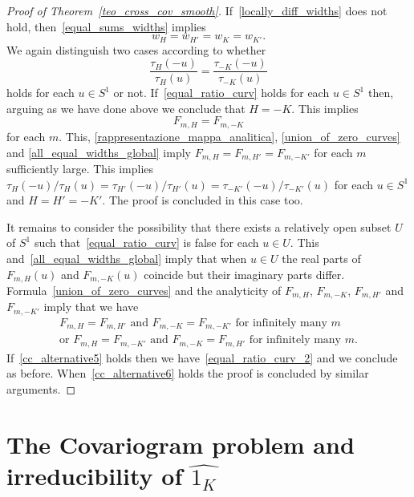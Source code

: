 \documentclass[a4paper]{amsart}
\theoremstyle{definition}
\numberwithin{equation}{section}
\begin{document}
\begin{proof}[Proof of Theorem~\ref{teo_cross_cov_smooth}]
If~\eqref{locally_diff_widths} does not hold, then~\eqref{equal_sums_widths} implies
\begin{equation}\label{all_equal_widths_global}
{{{w}}}_H={{{w}}}_{H'}={{{w}}}_K={{{w}}}_{K'}.
\end{equation}
We again distinguish two cases according to whether 
\begin{equation}\label{equal_ratio_curv}
\frac{{\tau}_{H}(-u)}{{\tau}_{H}(u)}=\frac{{\tau}_{-K}(-u)}{{\tau}_{-K}(u)}
\end{equation}
holds for each $u\in {S^{1}}$ or not.
If~\eqref{equal_ratio_curv} holds for each $u\in {S^{1}}$ then, arguing as we have done above we conclude that $H=-K$. This implies 
\[
 F_{m,H}=F_{m,-K}
\]
for each $m$. This, \eqref{rappresentazione_mappa_analitica}, \eqref{union_of_zero_curves} and  \eqref{all_equal_widths_global} imply $F_{m,H}=F_{m,H'}=F_{m,-K'}$ for each $m$ sufficiently large. This implies ${\tau}_{H}(-u)/{\tau}_{H}(u)={\tau}_{H'}(-u)/{\tau}_{H'}(u)={\tau}_{-K'}(-u)/{\tau}_{-K'}(u)$ for each $u\in {S^{1}}$ and $H=H'=-K'$. The proof is concluded in this case too.

It remains to consider the possibility that there exists a relatively open subset $U$ of ${S^{1}}$ such that~\eqref{equal_ratio_curv} is false  for each $u\in U$. This and~\eqref{all_equal_widths_global} imply that when $u\in U$ the real parts of $F_{m,H}(u)$ and $F_{m,-K}(u)$ coincide  but their imaginary parts differ.
Formula~\eqref{union_of_zero_curves} and the analyticity of $F_{m,H}$, $F_{m,-K}$, $F_{m,H'}$ and $F_{m,-K'}$ imply that we have
\begin{gather}
\text{$F_{m,H}=F_{m,H'}$ and $F_{m,-K}=F_{m,-K'}$ for infinitely many $m$}\label{cc_alternative5}\\
\text{or $F_{m,H}=F_{m,-K'}$ and $F_{m,-K}=F_{m,H'}$ for infinitely many $m$.}\label{cc_alternative6}
\end{gather}
If~\eqref{cc_alternative5} holds then we have~\eqref{equal_ratio_curv_2} and we conclude as before. When~\eqref{cc_alternative6} holds the proof is concluded by similar arguments.
\end{proof}

\section{The Covariogram problem and irreducibility of ${\widehat{{{1_K}}}}$}
\label{sec_phase_retr}
\end{document}

